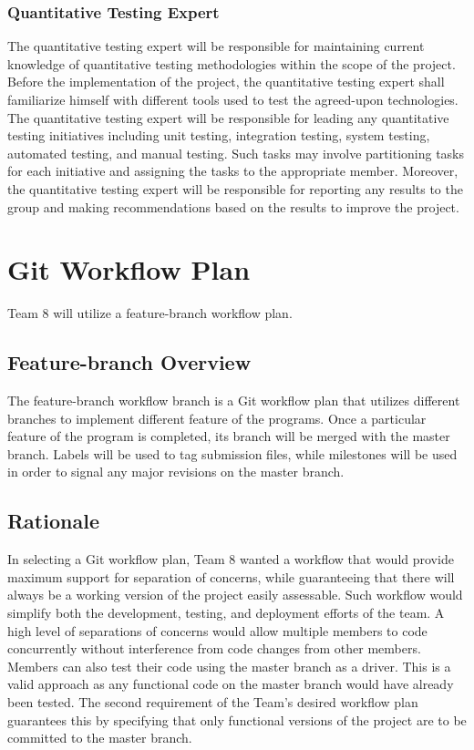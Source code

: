 \documentclass{article}
\begin{document}
\subsubsection{Quantitative Testing Expert}
The quantitative testing expert will be responsible for maintaining current 
knowledge of quantitative testing methodologies within the scope of the project. 
Before the implementation of the project, the quantitative testing expert shall 
familiarize himself with different tools used to test the agreed-upon 
technologies. The quantitative testing expert will be responsible for leading 
any quantitative testing initiatives including unit testing, integration 
testing, system testing, automated testing, and manual testing. Such tasks may 
involve partitioning tasks for each initiative and assigning the tasks to the 
appropriate member. Moreover, the quantitative testing expert will be 
responsible for reporting any results to the group and making recommendations 
based on the results to improve the project.

\section{Git Workflow Plan}
Team 8 will utilize a feature-branch workflow plan. 

\subsection{Feature-branch Overview}
The feature-branch workflow branch is a Git workflow plan that utilizes 
different branches to implement different feature of the programs. Once a 
particular feature of the program is completed, its branch will be merged with 
the master branch. Labels will be used to tag submission files, while milestones 
will be used in order to signal any major revisions on the master branch.

\subsection{Rationale}
In selecting a Git workflow plan, Team 8 wanted a workflow that would provide 
maximum support for separation of concerns, while guaranteeing that there will 
always be a working version of the project easily assessable. Such workflow 
would simplify both the development, testing, and deployment efforts of the 
team. A high level of separations of concerns would allow multiple members to 
code concurrently without interference from code changes from other members. 
Members can also test their code using the master branch as a driver. This is a 
valid approach as any functional code on the master branch would have already 
been tested. The second requirement of the Team's desired workflow plan 
guarantees this by specifying that only functional versions of the project are 
to be committed to the master branch. 
\end{document}
